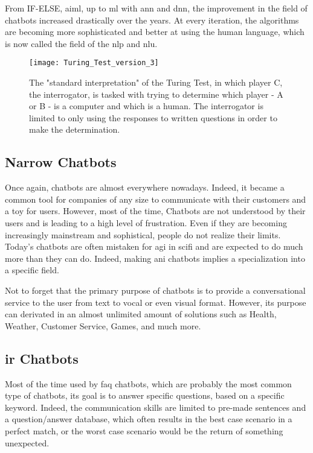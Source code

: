 From IF-ELSE, \gls{aiml}, up to \gls{ml} with \gls{ann} and \gls{dnn}, the improvement in the field of chatbots increased drastically over the years. At every iteration, the algorithms are becoming more sophisticated and better at using the human language, which is now called the field of the \gls{nlp} and \gls{nlu}.

\begin{figure}[ht!]
    \centering
    \texttt{[image: Turing\_Test\_version\_3]}
    \caption{
       The "standard interpretation" of the Turing Test, in which player C, the interrogator, is tasked with trying to determine which player - A or B - is a computer and which is a human. The interrogator is limited to only using the responses to written questions in order to make the determination. \cite{wikipedia:turing_test_img}
    }
    \label{fig:wikipedia_turing_test_img}
\end{figure}

\subsection{Narrow Chatbots}
Once again, chatbots are almost everywhere nowadays. Indeed, it became a common tool for companies of any size to communicate with their customers and a toy for users. However, most of the time, Chatbots are not understood by their users and is leading to a high level of frustration. Even if they are becoming increasingly mainstream and sophistical, people do not realize their limits. Today's chatbots are often mistaken for \gls{agi} in \gls{scifi} and are expected to do much more than they can do. Indeed, making \gls{ani} chatbots implies a specialization into a specific field.

Not to forget that the primary purpose of chatbots is to provide a conversational service to the user from text to vocal or even visual format. However, its purpose can derivated in an almost unlimited amount of solutions such as Health, Weather, Customer Service, Games, and much more.

\subsection{\gls{ir} Chatbots}
Most of the time used by \gls{faq} chatbots, which are probably the most common type of chatbots, its goal is to answer specific questions, based on a specific keyword. Indeed, the communication skills are limited to pre-made sentences and a question/answer database, which often results in the best case scenario in a perfect match, or the worst case scenario would be the return of something unexpected.

